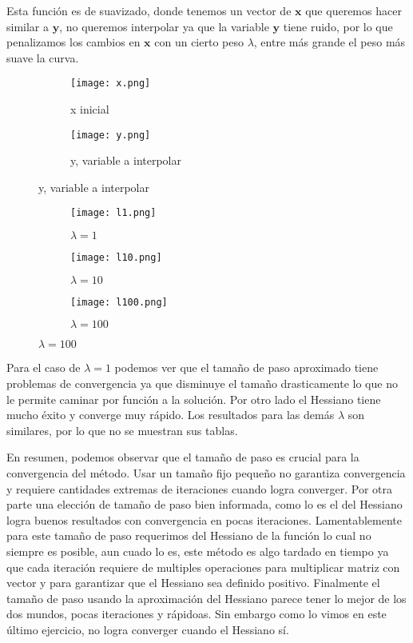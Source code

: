 \documentclass{article}
\begin{document}
\begin{enumerate}
Esta función es de suavizado, donde tenemos un vector de $\boldsymbol{x}$ que queremos hacer similar a $\boldsymbol{y}$, no queremos interpolar ya que la variable $\boldsymbol{y}$ tiene ruido, por lo que penalizamos los cambios en $\boldsymbol{x}$ con un cierto peso $\lambda$, entre más grande el peso más suave la curva.

\begin{figure}[ht]
  \centering
  \begin{subfigure}[b]{0.3\linewidth}
      \centering
      \texttt{[image: x.png]}
      \caption{x inicial}
      \label{fig:x2f1}
  \end{subfigure}
  \begin{subfigure}[b]{0.3\linewidth}
      \centering
      \texttt{[image: y.png]}
      \caption{y, variable a interpolar}
      \label{fig:y2h1}
  \end{subfigure}
\end{figure}

\begin{figure}[ht]
  \begin{subfigure}[b]{0.3\linewidth}
      \centering
      \texttt{[image: l1.png]}
      \caption{$\lambda = 1$}
      \label{fig:l2f1}
  \end{subfigure}
  \begin{subfigure}[b]{0.3\linewidth}
      \centering
      \texttt{[image: l10.png]}
      \caption{$\lambda = 10$}
      \label{fig:l2h1}
  \end{subfigure}
  \begin{subfigure}[b]{0.3\linewidth}
      \centering
      \texttt{[image: l100.png]}
      \caption{$\lambda = 100$}
      \label{fig:l2a1}
  \end{subfigure}
\end{figure}

Para el caso de $\lambda = 1$ podemos ver que el tamaño de paso aproximado tiene problemas de convergencia ya que disminuye el tamaño drasticamente lo que no le permite caminar por función a la solución. Por otro lado el Hessiano tiene mucho éxito y converge muy rápido. Los resultados para las demás $\lambda$ son similares, por lo que no se muestran sus tablas.

En resumen, podemos observar que el tamaño de paso es crucial para la convergencia del método. Usar un tamaño fijo pequeño no garantiza convergencia y requiere cantidades extremas de iteraciones cuando logra converger. Por otra parte una elección de tamaño de paso bien informada, como lo es el del Hessiano logra buenos resultados con convergencia en pocas iteraciones. Lamentablemente para este tamaño de paso requerimos del Hessiano de la función lo cual no siempre es posible, aun cuado lo es, este método es algo tardado en tiempo ya que cada iteración requiere de multiples operaciones para multiplicar matriz con vector y para garantizar que el Hessiano sea definido positivo. Finalmente el tamaño de paso usando la aproximación del Hessiano parece tener lo mejor de los dos mundos, pocas iteraciones y rápidoas. Sin embargo como lo vimos en este último ejercicio, no logra converger cuando el Hessiano sí.


\end{enumerate}
\end{document}
